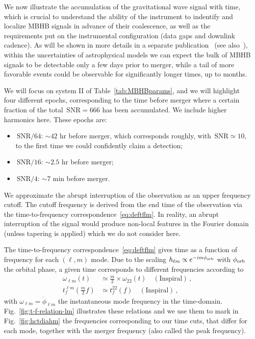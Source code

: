 \documentclass[aps,showpacs,twocolumn,prd,superscriptaddress,nofootinbib]{revtex4-1}
\newcommand{\bsub}{\begin{subequations}}
\newcommand{\esub}{\end{subequations}}
\newcommand{\SNR}{\,\mathrm{SNR}}
\begin{document}
We now illustrate the accumulation of the gravitational wave signal with time, which is crucial to understand the ability of the instrument to indentify and localize MBHB signals in advance of their coalescence, as well as the requirements put on the instrumental configuration (data gaps and downlink cadence). As will be shown in more details in a separate publication~\cite{MarsatBabak20} (see also~\cite{KatzLarson18}), within the uncertainties of astrophysical models we can expect the bulk of MBHB signals to be detectable only a few days prior to merger, while a tail of more favorable events could be observable for significantly longer times, up to months.

We will focus on system II of Table~\ref{tab:MBHBparams}, and we will highlight four different epochs, corresponding to the time before merger where a certain fraction of the total $\SNR = 666$ has been accumulated. We include higher harmonics here. These epochs are:
\begin{itemize}
	\item $\SNR/64$: $\sim 42$ hr before merger, which corresponds roughly, with $\SNR \simeq 10$, to the first time we could confidently claim a detection;
	\item $\SNR/16$: $\sim 2.5$ hr before merger;
	\item $\SNR/4$: $\sim 7$ min before merger.
\end{itemize}

We approximate the abrupt interruption of the observation as an upper frequency cutoff.
The cutoff frequency is derived from the end time of the observation via the time-to-frequency correspondence~\eqref{eq:deftflm}.
In reality, an abrupt interruption of the signal would produce non-local features in the Fourier domain (unless tapering is applied) which we do not consider here.

The time-to-frequency correspondence~\eqref{eq:deftflm} gives time as a function of frequency for each $(\ell, m)$ mode. Due to the scaling $h_{\ell m} \propto e^{-i m \phi_{\rm orb}}$ with $\phi_{\rm orb}$ the orbital phase, a given time corresponds to different frequencies according to
\bsub\label{eq:fscalinglm}
\begin{align}
	\omega_{\ell m}(t) &\simeq \frac{m}{2} \times \omega_{22}(t) \quad (\mathrm{Inspiral})\,, \\
	t_{f}^{\ell m} \left( \frac{m}{2} f\right) &\simeq t_{f}^{22} (f) \quad (\mathrm{Inspiral}) \,,
\end{align}
\esub
with $\omega_{\ell m} = \dot{\phi}_{\ell m}$ the instantaneous mode frequency in the time-domain. Fig.~\ref{fig:t-f-relation-lm} illustrates these relations and we use them to mark in Fig.~\ref{fig:hctdiahm} the frequencies corresponding to our time cuts, that differ for each mode, together with the merger frequency (also called the peak frequency).
\end{document}
